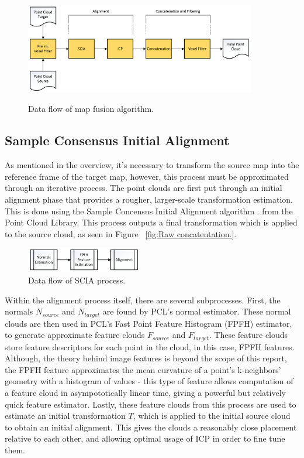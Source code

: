 \documentclass[letterpaper, oneside, 10pt]{report}
\begin{document}
\begin{figure}[h!]
 \caption{Data flow of map fusion algorithm.}
 \centering
   \includegraphics[width=0.9\textwidth]{images/mapfusion}
 \label{fig: map fusion.}
\end{figure}

    \subsection{Sample Consensus Initial Alignment}

    \noindent As mentioned in the overview, it's necessary to transform the source map into the reference frame of the target map, however, this process must be approximated through an iterative process. The point clouds are first put through an initial alignment phase that provides a rougher, larger-scale transformation estimation. This is done using the Sample Concensus Initial Alignment algorithm \cite{rusu2009fast}. from the Point Cloud Library. This process outputs a final transformation which is applied to the source cloud, as seen in Figure ~\ref{fig:Raw concatentation.}.

    \begin{figure}[h]
     \caption{Data flow of SCIA process.}
     \centering
       \includegraphics[width=0.45\textwidth]{images/initialalignment}
    \end{figure}

    \noindent Within the alignment process itself, there are several subprocesses. First, the normals $N_{source}$ and $N_{target}$ are found by PCL's normal estimator. These normal clouds are then used in PCL's Fast Point Feature Histogram (FPFH) \cite{rusu2009fast,rusu2009fastlabel} estimator, to generate approximate feature clouds $F_{source}$ and $F_{target}$. These feature clouds store feature descriptors for each point in the cloud, in this case, FPFH features. Although, the theory behind image features is beyond the scope of this report, the FPFH feature approximates the mean curvature of a point's k-neighbors' geometry with a histogram of values - this type of feature allows computation of a feature cloud in asympototically linear time, giving a powerful but relatively quick feature estimator. Lastly, these feature clouds from this process are used to estimate an initial transformation $T$, which is applied to the initial source cloud to obtain an initial alignment. This gives the clouds a reasonably close placement relative to each other, and allowing optimal usage of ICP in order to fine tune them.
\end{document}
